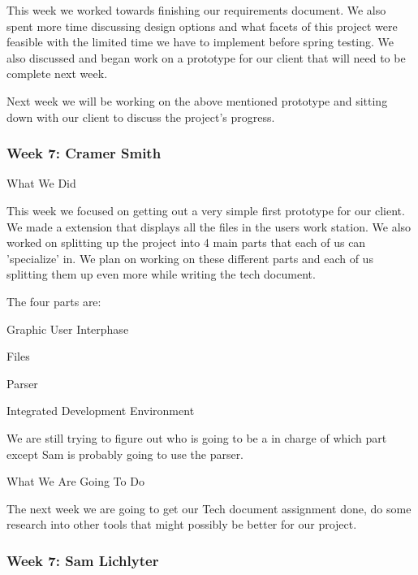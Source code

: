This week we worked towards finishing our requirements document. We also spent more time discussing design options and what facets of this project were feasible with the limited time we have to implement before spring testing. We also discussed and began work on a prototype for our client that will need to be complete next week.



Next week we will be working on the above mentioned prototype and sitting down with our client to discuss the project's  progress. \\ 

 \subsubsection{Week 7: Cramer Smith}

What We Did



This week we focused on getting out a very simple first prototype for our client. We made a extension that displays all the files in the users work station. We also worked on splitting up the project into 4 main parts that each of us can 'specialize' in. We plan on working on these different parts and each of us splitting them up even more while writing the tech document. 



The four parts are:

  Graphic User Interphase

  Files

  Parser

  Integrated Development Environment



We are still trying to figure out who is going to be a in charge of which part except Sam is probably going to use the parser.



What We Are Going To Do



The next week we are going to get our Tech document assignment done, do some research into other tools that might possibly be better for our project. \\ 

 \subsubsection{Week 7: Sam Lichlyter}

